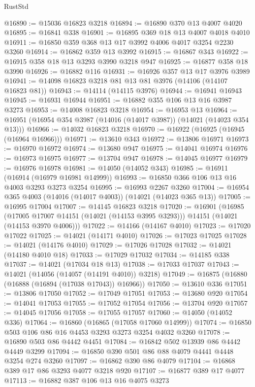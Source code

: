 \begin{lexlean}{RustStd}
\begin{coremodule}
@16890 := @15036 @16823 @3218
@16894 := @16890 @370 @13 @4007 @4020
@16895 := @16841 @338
@16901 := @16895 @369 @18 @13 @4007 @4018 @4010
@16911 := @16850 @359 @368 @13 @17 @3992 @4006 @4017 @3254 @2230 @3260
@16914 := @16862 @359 @13 @3992
@16915 := @16867 @343
@16922 := @16915 @358 @18 @13 @3293 @3990 @3218 @947
@16925 := @16877 @358 @18 @3990
@16926 := @16882 @116
@16931 := @16926 @357 @13 @17 @3976 @3989
@16941 := @14098 @16823 @3218 @81 @13 @81 @3976 (@14106 (@14107 @16823 @81))
@16943 := @14114 (@14115 @3976)
@16944 := @16941 @16943
@16945 := @16931 @16944
@16951 := @16882 @355 @106 @13 @16 @3987 @3273
@16953 := @14008 @16823 @3218
@16954 := @16953 @13
@16964 := @16951 (@16954 @354 @3987 (@14016 (@14017 @3987)) (@14021 (@14023 @354 @13)))
@16966 := @14032 @16823 @3218
@16970 := @16922 (@16925 (@16945 (@16964 @16966)))
@16971 := @13610 @343
@16972 := @13806 @16971
@16973 := @16970 @16972
@16974 := @13680 @947
@16975 := @14041 @16974
@16976 := @16973 @16975
@16977 := @13704 @947
@16978 := @14045 @16977
@16979 := @16976 @16978
@16981 := @14050 (@14052 @343)
@16985 := @16911 (@16914 (@16979 @16981 @14999))
@16993 := @16850 @366 @106 @13 @16 @4003 @3293 @3273 @3254
@16995 := @16993 @2267 @3260
@17004 := @16954 @365 @4003 (@14016 (@14017 @4003)) (@14021 (@14023 @365 @13))
@17005 := @16995 @17004
@17007 := @14145 @16823 @3218
@17020 := @16901
    (@16985
      (@17005 @17007 @14151 (@14021 (@14153 @3995 @3293)))
      @14151
      (@14021 (@14153 @3970 @4006)))
@17022 := @14166 (@14167 @4010)
@17023 := @17020 @17022
@17025 := @14021 (@14171 @4010)
@17026 := @17023 @17025
@17028 := @14021 (@14176 @4010)
@17029 := @17026 @17028
@17032 := @14021 (@14180 @4010 @18)
@17033 := @17029 @17032
@17034 := @14185 @338
@17037 := @14021 (@17034 @18 @13)
@17038 := @17033 @17037
@17043 := @14021 (@14056 (@14057 (@14191 @4010)) @3218)
@17049 := @16875 (@16880 (@16888 (@16894 (@17038 @17043)) @16966))
@17050 := @13610 @336
@17051 := @13806 @17050
@17052 := @17049 @17051
@17053 := @13680 @920
@17054 := @14041 @17053
@17055 := @17052 @17054
@17056 := @13704 @920
@17057 := @14045 @17056
@17058 := @17055 @17057
@17060 := @14050 (@14052 @336)
@17064 := @16860 (@16865 (@17058 @17060 @14999))
@17074 := @16850 @503 @106 @86 @16 @4453 @3293 @3273 @3254 @4032 @3260
@17078 := @16890 @503 @86 @4442 @4451
@17084 := @16842 @502 @13939 @86 @4442 @4449 @3299
@17094 := @16850 @390 @501 @86 @88 @4079 @4441 @4448 @3254 @274 @3260
@17097 := @16862 @390 @86 @4079
@17104 := @16868 @389 @17 @86 @3293 @4077 @3218 @920
@17107 := @16877 @389 @17 @4077
@17113 := @16882 @387 @106 @13 @16 @4075 @3273

\end{coremodule}
\end{lexlean}
